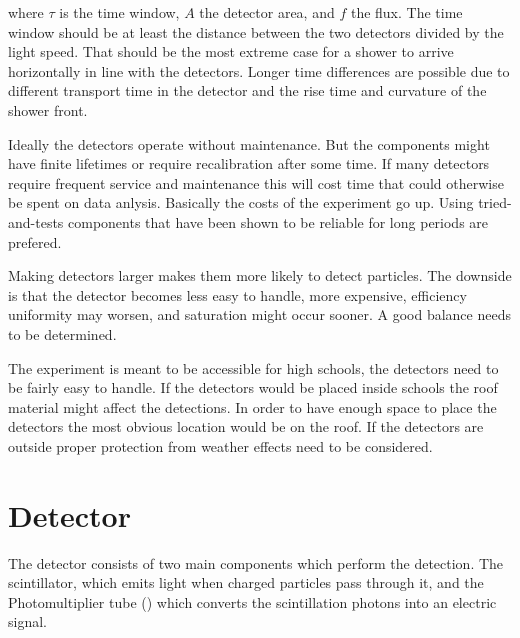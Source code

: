 where $\tau$ is the time window, $A$ the detector area, and $f$ the flux. The time window should be at least the distance between the two detectors divided by the light speed. That should be the most extreme case for a shower to arrive horizontally in line with the detectors. Longer time differences are possible due to different transport time in the detector and the rise time and curvature of the shower front.

Ideally the detectors operate without maintenance. But the components might have finite lifetimes or require recalibration after some time. If many detectors require frequent service and maintenance this will cost time that could otherwise be spent on data anlysis. Basically the costs of the experiment go up. Using tried-and-tests components that have been shown to be reliable for long periods are prefered.

Making detectors larger makes them more likely to detect particles. The downside is that the detector becomes less easy to handle, more expensive, efficiency uniformity may worsen, and saturation might occur sooner. A good balance needs to be determined.

The experiment is meant to be accessible for high schools, the detectors need to be fairly easy to handle. If the detectors would be placed inside schools the roof material might affect the detections. In order to have enough space to place the detectors the most obvious location would be on the roof. If the detectors are outside proper protection from weather effects need to be considered.


\section{Detector}

The detector consists of two main components which perform the detection. The scintillator, which emits light when charged particles pass through it, and the Photomultiplier tube (\pmt) which converts the scintillation photons into an electric signal.

